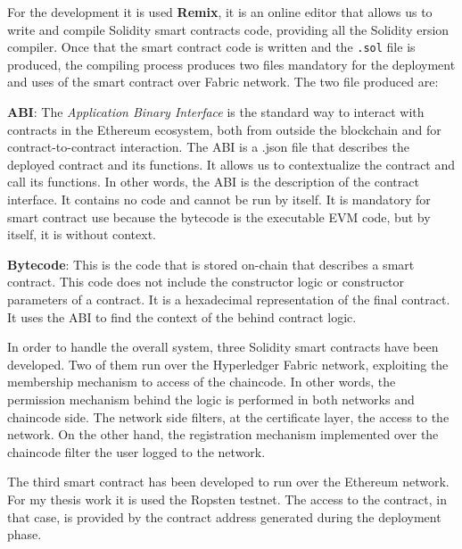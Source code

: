 For the development it is used \textbf{Remix}\cite{remix}, it is an online
editor that allows us to write and compile Solidity smart contracts code, providing all the Solidity 
ersion compiler. Once that the smart contract code is written and the \texttt{.sol} file is produced, 
the compiling process produces two files mandatory for the deployment and uses of the smart contract over 
Fabric network. 
The two file produced are: 
\begin{outline}
    \1 \textbf{ABI}: The \textit{Application Binary Interface} is the standard way to interact with contracts 
    in the Ethereum ecosystem, both from outside the blockchain and for contract-to-contract interaction. The 
    ABI is a .json file that describes the deployed contract and its functions. It allows us to contextualize 
    the contract and call its functions. In other words, the ABI is the description of the contract interface. 
    It contains no code and cannot be run by itself. It is mandatory for smart contract use because the bytecode 
    is the executable EVM code, but by itself, it is without context.

    \1 \textbf{Bytecode}: This is the code that is stored on-chain that describes a smart contract. 
    This code does not include the constructor logic or constructor parameters of a contract. 
    It is a hexadecimal representation of the final contract. It uses the ABI to find the 
    context of the behind contract logic. 
\end{outline}

\bigskip

In order to handle the overall system, three Solidity smart contracts have been developed. Two of them run over the Hyperledger 
Fabric network, exploiting the membership mechanism to access of the chaincode.
In other words, the permission mechanism behind the logic is performed in both networks and chaincode side. 
The network side filters, at the certificate layer, the access to the network. On the other hand, the registration 
mechanism implemented over the chaincode filter the user logged to the network. 
\bigskip

The third smart contract has been developed to run over the Ethereum network. For my thesis work it is used the Ropsten 
testnet. The access to the contract, in that case, is provided by the contract address generated during the deployment 
phase. 
\bigskip

